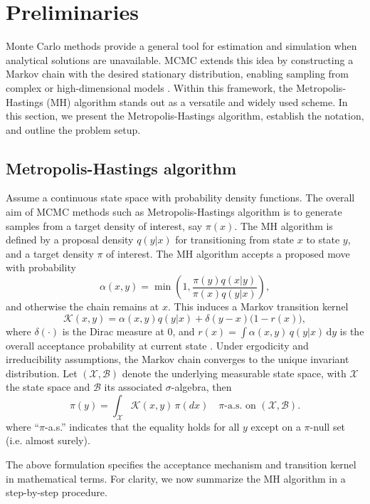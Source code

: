 \documentclass[conference]{IEEEtran}
\newcommand{\df}{\mathrm{d}}
\theoremstyle{definition}
\begin{document}
\section{Preliminaries}
Monte Carlo methods provide a general tool for estimation and simulation when analytical solutions are unavailable. 
MCMC extends this idea by constructing a Markov chain with the desired stationary distribution, enabling sampling from complex or high-dimensional models \cite{Spall2003,HillandSpall}. 
Within this framework, the Metropolis-Hastings (MH) algorithm stands out as a versatile and widely used scheme. In this section, we present the Metropolis-Hastings algorithm, establish the notation, and outline the problem setup.


\subsection{Metropolis-Hastings algorithm}
Assume a continuous state space with probability density functions. The overall aim of MCMC methods such as Metropolis-Hastings algorithm is to generate samples from a target density of interest, say \(\pi(x)\). The MH algorithm is defined by a proposal density $q(y|x)$ for transitioning from state $x$ to state $y$, and a target density $\pi$ of interest.
The MH algorithm accepts a proposed move with probability
\[
\alpha(x,y) = \min\!\left(1, \frac{\pi(y)q(x|y)}{\pi(x)q(y|x)}\right),
\]
and otherwise the chain remains at $x$. 
This induces a Markov transition kernel
\[
\mathcal{K}(x,y) = \alpha(x,y) q(y|x) + \delta(y-x)\big(1-r(x)\big),
\]
where $\delta(\cdot)$ is the Dirac measure at $0$, and
\(
r(x) = \int \alpha(x,y)\,q(y|x)\,\df y
\)
is the overall acceptance probability at current state \cite{HillandSpall}. Under ergodicity and irreducibility assumptions, 
the Markov chain converges to the unique invariant distribution. 
Let $(\mathcal{X},\mathcal{B})$ denote the underlying measurable state space, 
with $\mathcal{X}$ the state space and $\mathcal{B}$ its associated $\sigma$-algebra, then
\[
\pi(y)=\int_{\mathcal{X}}\mathcal{K}(x,y)\,\pi(dx)
\quad \pi\text{-a.s. on }(\mathcal{X},\mathcal{B}).
\]
where ``$\pi$-a.s.'' indicates that the equality holds for all $y$ except on a $\pi$-null set (i.e. almost surely).

The above formulation specifies the acceptance mechanism and transition kernel in mathematical terms. 
For clarity, we now summarize the MH algorithm in a step-by-step procedure.
\end{document}

